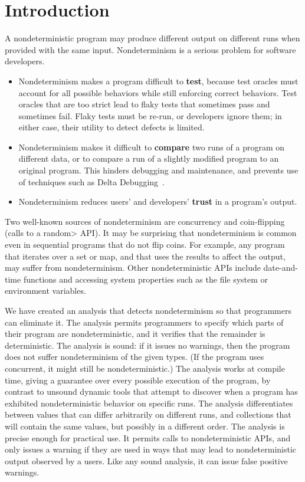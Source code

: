\section{Introduction}

A nondeterministic program may produce different output on different runs
when provided with the same input.
Nondeterminism is a serious problem for software developers.
\begin{itemize}
\item
  Nondeterminism makes a program difficult to \textbf{test}, because test
  oracles must account for all possible behaviors while still enforcing
  correct behaviors.  Test oracles that are too strict lead to flaky tests
  that sometimes pass and sometimes fail.  Flaky tests must be re-run, or
  developers ignore them; in either case, their utility to detect defects
  is limited.
\item
  Nondeterminism makes it difficult to \textbf{compare} two runs of a
  program on different data, or to compare a run of a slightly modified
  program to an original program.  This hinders debugging and maintenance,
  and prevents use of techniques such as Delta Debugging~\cite{Zeller1999}.
\item
  Nondeterminism reduces users' and developers' \textbf{trust} in a program's output.
\end{itemize}

Two well-known sources of nondeterminism are concurrency
and coin-flipping
(calls to a \<random> API).
It may be surprising that nondeterminism is common even in sequential
programs that do not flip coins.
For example, any program that iterates over a set or map, and that uses the
results to affect the output, may suffer from nondeterminism.
Other nondeterministic APIs include date-and-time functions and
accessing system properties such as the file system or environment variables.

We have created an analysis that detects nondeterminism so that
programmers can eliminate it.
The analysis permits programmers to specify which parts of their program
are nondeterministic, and it verifies that the remainder is deterministic.
%
The analysis is sound:  if it issues no warnings, then the program does not
suffer nondeterminism of the given types.  (If the program uses concurrent,
it might still be nondeterministic.)
%
The analysis works at compile time, giving a guarantee over every possible
execution of the program, by contrast to unsound dynamic tools that attempt
to discover when a program has exhibited nondeterministic behavior on
specific runs.
%
The analysis differentiates between values that can differ arbitrarily on
different runs, and collections that will contain the same values, but
possibly in a different order.
%
The analysis is precise enough for practical use.  It permits calls to
nondeterministic APIs, and only issues a warning if they are used in ways
that may lead to nondeterministic output observed by a users.  Like any
sound analysis, it can issue false positive warnings.


